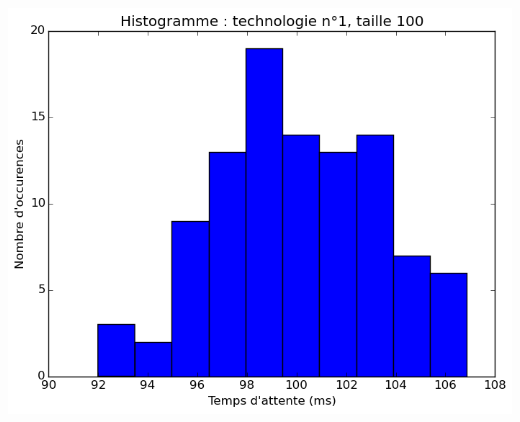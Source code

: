 \documentclass[a4paper,10pt]{article}
\begin{document}
\includegraphics[scale=0.4]{img/1-100.png}
\\
\end{document}
